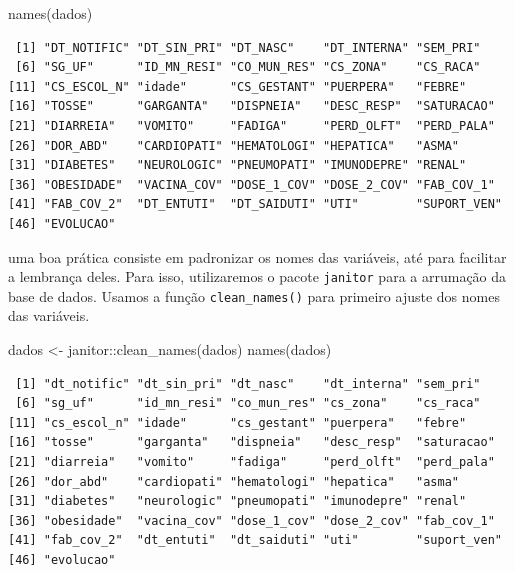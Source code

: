 \documentclass[
  letterpaper,
  DIV=11,
  numbers=noendperiod]{scrreprt}
\newenvironment{Shaded}{\begin{snugshade}}{\end{snugshade}}
\newcommand{\FunctionTok}[1]{\textcolor[rgb]{0.28,0.35,0.67}{#1}}
\newcommand{\NormalTok}[1]{\textcolor[rgb]{0.00,0.23,0.31}{#1}}
\newcommand{\OtherTok}[1]{\textcolor[rgb]{0.00,0.23,0.31}{#1}}
\newcommand{\SpecialCharTok}[1]{\textcolor[rgb]{0.37,0.37,0.37}{#1}}
\begin{document}
\begin{Shaded}
\begin{Highlighting}[]
\FunctionTok{names}\NormalTok{(dados)}
\end{Highlighting}
\end{Shaded}

\begin{verbatim}
 [1] "DT_NOTIFIC" "DT_SIN_PRI" "DT_NASC"    "DT_INTERNA" "SEM_PRI"   
 [6] "SG_UF"      "ID_MN_RESI" "CO_MUN_RES" "CS_ZONA"    "CS_RACA"   
[11] "CS_ESCOL_N" "idade"      "CS_GESTANT" "PUERPERA"   "FEBRE"     
[16] "TOSSE"      "GARGANTA"   "DISPNEIA"   "DESC_RESP"  "SATURACAO" 
[21] "DIARREIA"   "VOMITO"     "FADIGA"     "PERD_OLFT"  "PERD_PALA" 
[26] "DOR_ABD"    "CARDIOPATI" "HEMATOLOGI" "HEPATICA"   "ASMA"      
[31] "DIABETES"   "NEUROLOGIC" "PNEUMOPATI" "IMUNODEPRE" "RENAL"     
[36] "OBESIDADE"  "VACINA_COV" "DOSE_1_COV" "DOSE_2_COV" "FAB_COV_1" 
[41] "FAB_COV_2"  "DT_ENTUTI"  "DT_SAIDUTI" "UTI"        "SUPORT_VEN"
[46] "EVOLUCAO"  
\end{verbatim}

uma boa prática consiste em padronizar os nomes das variáveis, até para
facilitar a lembrança deles. Para isso, utilizaremos o pacote
\texttt{janitor} para a arrumação da base de dados. Usamos a função
\texttt{clean\_names()} para primeiro ajuste dos nomes das variáveis.

\begin{Shaded}
\begin{Highlighting}[]
\NormalTok{dados }\OtherTok{\textless{}{-}}\NormalTok{ janitor}\SpecialCharTok{::}\FunctionTok{clean\_names}\NormalTok{(dados) }
\FunctionTok{names}\NormalTok{(dados)}
\end{Highlighting}
\end{Shaded}

\begin{verbatim}
 [1] "dt_notific" "dt_sin_pri" "dt_nasc"    "dt_interna" "sem_pri"   
 [6] "sg_uf"      "id_mn_resi" "co_mun_res" "cs_zona"    "cs_raca"   
[11] "cs_escol_n" "idade"      "cs_gestant" "puerpera"   "febre"     
[16] "tosse"      "garganta"   "dispneia"   "desc_resp"  "saturacao" 
[21] "diarreia"   "vomito"     "fadiga"     "perd_olft"  "perd_pala" 
[26] "dor_abd"    "cardiopati" "hematologi" "hepatica"   "asma"      
[31] "diabetes"   "neurologic" "pneumopati" "imunodepre" "renal"     
[36] "obesidade"  "vacina_cov" "dose_1_cov" "dose_2_cov" "fab_cov_1" 
[41] "fab_cov_2"  "dt_entuti"  "dt_saiduti" "uti"        "suport_ven"
[46] "evolucao"  
\end{verbatim}
\end{document}
